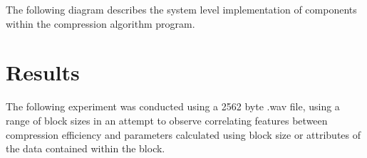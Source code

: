 \documentclass{article}
\begin{document}
The following diagram describes the system level implementation of components within the compression algorithm program.\\

\section*{Results}

The following experiment was conducted using a 2562 byte .wav file, using a range of block sizes in an attempt to observe correlating features between compression efficiency and parameters calculated using block size or attributes of the data contained within the block.
\end{document}
